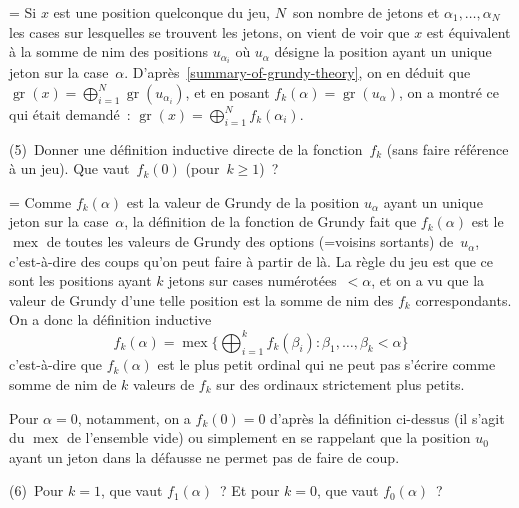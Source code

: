 \documentclass[12pt,a4paper]{article}
\theoremstyle{definition}
\newcommand{\mex}{\operatorname{mex}}
\newcommand{\gr}{\operatorname{gr}}
\newif\ifcorrige
\newenvironment{corrige}%
{\ifcorrige\relax\else\setbox0=\vbox\bgroup\fi%
\smallbreak\noindent{\underbar{\textit{Corrigé.}}\quad}}
{{\hbox{}\nobreak\hfill\checkmark}%
\ifcorrige\relax\else\egroup\fi\par}
\begin{document}
\begin{corrige}
Si $x$ est une position quelconque du jeu, $N$ son nombre de jetons et
$\alpha_1,\ldots,\alpha_N$ les cases sur lesquelles se trouvent les
jetons, on vient de voir que $x$ est équivalent à la somme de nim des
positions $u_{\alpha_i}$ où $u_{\alpha}$ désigne la position ayant un
unique jeton sur la case $\alpha$.
D'après \ref{summary-of-grundy-theory}, on en déduit que $\gr(x) =
\bigoplus_{i=1}^N \gr(u_{\alpha_i})$, et en posant $f_k(\alpha) =
\gr(u_\alpha)$, on a montré ce qui était demandé : $\gr(x) =
\bigoplus_{i=1}^N f_k(\alpha_i)$.
\end{corrige}

\smallbreak

(5) Donner une définition inductive directe de la fonction $f_k$ (sans
faire référence à un jeu).  Que vaut $f_k(0)$ (pour $k\geq 1$) ?

\begin{corrige}
Comme $f_k(\alpha)$ est la valeur de Grundy de la position $u_\alpha$
ayant un unique jeton sur la case $\alpha$, la définition de la
fonction de Grundy fait que $f_k(\alpha)$ est le $\mex$ de toutes les
valeurs de Grundy des options (=voisins sortants) de $u_\alpha$,
c'est-à-dire des coups qu'on peut faire à partir de là.  La règle du
jeu est que ce sont les positions ayant $k$ jetons sur cases
numérotées $<\alpha$, et on a vu que la valeur de Grundy d'une telle
position est la somme de nim des $f_k$ correspondants.  On a donc la
définition inductive
\[
f_k(\alpha) = \mex\Big\{\bigoplus_{i=1}^k f_k(\beta_i)
: \beta_1,\ldots,\beta_k < \alpha \Big\}
\]
c'est-à-dire que $f_k(\alpha)$ est le plus petit ordinal qui ne peut
pas s'écrire comme somme de nim de $k$ valeurs de $f_k$ sur des
ordinaux strictement plus petits.

Pour $\alpha=0$, notamment, on a $f_k(0) = 0$ d'après la définition
ci-dessus (il s'agit du $\mex$ de l'ensemble vide) ou simplement en se
rappelant que la position $u_0$ ayant un jeton dans la défausse ne
permet pas de faire de coup.
\end{corrige}

\smallbreak

(6) Pour $k=1$, que vaut $f_1(\alpha)$ ?  Et pour $k=0$, que vaut
$f_0(\alpha)$ ?
\end{document}
